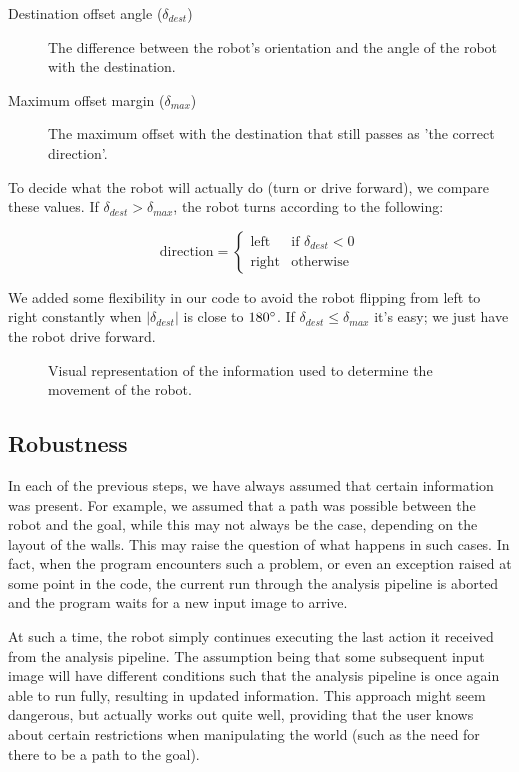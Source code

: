 \documentclass[10pt, abstracton, twocolumn]{scrartcl}
\begin{document}
\begin{description}
\item[Destination offset angle ($\delta_{dest}$)] The difference between the robot's orientation and the angle of the robot with the destination.
\item[Maximum offset margin ($\delta_{max}$)] The maximum offset with the destination that still passes as 'the correct direction'.
\end{description}

To decide what the robot will actually do (turn or drive forward), we compare these values. If $\delta_{dest} > \delta_{max}$, the robot turns according to the following:

\[
\textrm{direction} =
\begin{cases}
\textrm{left} & \textrm{if } \delta_{dest} < 0 \\
\textrm{right} & \textrm{otherwise}
\end{cases}
\]

We added some flexibility in our code to avoid the robot flipping from left to right constantly when $\lvert \delta_{dest}\rvert$ is close to $180\degree$.
If $\delta_{dest} \leq \delta_{max}$ it's easy; we just have the robot drive forward.

\begin{figure}[h]
        \centering
        
        \caption{\small Visual representation of the information used to determine the movement of the robot.}
        \label{fig:controlAngles}
\end{figure}

\subsection{Robustness}
In each of the previous steps, we have always assumed that certain information was present. For example, we assumed that a path was possible between the robot and the goal, while this may not always be the case, depending on the layout of the walls. This may raise the question of what happens in such cases. In fact, when the program encounters such a problem, or even an exception raised at some point in the code, the current run through the analysis pipeline is aborted and the program waits for a new input image to arrive.

At such a time, the robot simply continues executing the last action it received from the analysis pipeline. The assumption being that some subsequent input image will have different conditions such that the analysis pipeline is once again able to run fully, resulting in updated information. This approach might seem dangerous, but actually works out quite well, providing that the user knows about certain restrictions when manipulating the world (such as the need for there to be a path to the goal).
\end{document}
